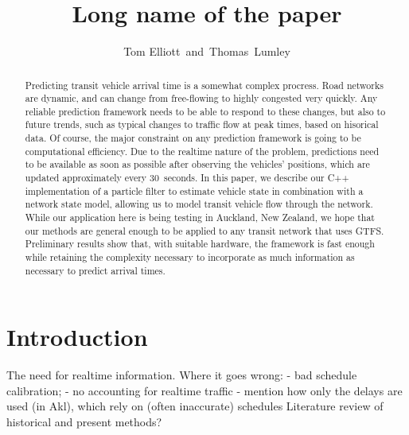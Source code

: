 \documentclass[times, doublespace]{anzsauth}
\begin{document}
\cleanlookdateon
{}
\title{Long name of the paper}
\author{Tom Elliott\corrauth~and~Thomas~Lumley}
\address{
    Department of Statistics, University of Auckland, 
    Auckland 1142, New Zealand\\
    Email: \texttt{tom.elliott@auckland.ac.nz}
}

\begin{abstract}
Predicting transit vehicle arrival time is a somewhat complex procress.
Road networks are dynamic, and can change from free-flowing to highly congested
very quickly.
Any reliable prediction framework needs to be able to respond to these changes,
but also to future trends, such as typical changes to traffic flow
at peak times, based on hisorical data.
Of course, the major constraint on any prediction framework is going to be
computational efficiency.
Due to the realtime nature of the problem, predictions need to be 
available as soon as possible after observing the vehicles' positions,
which are updated approximately every 30~seconds.
In this paper, we describe our C++ implementation of a particle filter to estimate
vehicle state in combination with a network state model,
allowing us to model transit vehicle flow through the network.
While our application here is being testing in Auckland, New Zealand,
we hope that our methods are general enough to be applied to any
transit network that uses GTFS.
Preliminary results show that, with suitable hardware,
the framework is fast enough while retaining the complexity necessary
to incorporate as much information as necessary to predict arrival times.
\end{abstract}


\maketitle
\section{Introduction}
\label{sec:intro}


The need for realtime information.
Where it goes wrong: 
- bad schedule calibration;
- no accounting for realtime traffic 
- mention how only the delays are used (in Akl), which rely on (often inaccurate) schedules
Literature review of historical and present methods?
\end{document}
